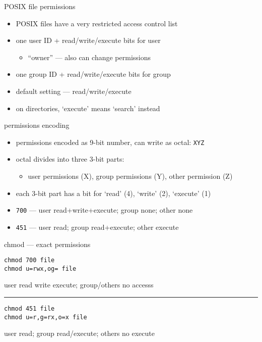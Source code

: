 \begin{frame}{POSIX file permissions}
    \begin{itemize}
    \item POSIX files have a very restricted access control list
    \vspace{.5cm}
    \item one user ID + read/write/execute bits for user
        \begin{itemize}
        \item ``owner'' --- also can change permissions
        \end{itemize}
    \item one group ID + read/write/execute bits for group
    \item default setting --- read/write/execute
    \vspace{.5cm}
    \item on directories, `execute' means `search' instead
    \end{itemize}
\end{frame}

\begin{frame}{permissions encoding}
\begin{itemize}
    \item permissions encoded as 9-bit number, can write as octal: \texttt{XYZ}
    \item octal divides into three 3-bit parts:
        \begin{itemize}
        \item user permissions (X), group permissions (Y), other permission (Z)
        \end{itemize}
    \item each 3-bit part has a bit for `read' (4), `write' (2), `execute' (1)
    \vspace{.5cm}
    \item \texttt{700} --- user read+write+execute; group none; other none
    \item \texttt{451} --- user read; group read+execute; other execute
\end{itemize}
\end{frame}

\begin{frame}[fragile]{chmod --- exact permissions}
\begin{Verbatim}
chmod 700 file
chmod u=rwx,og= file
\end{Verbatim}
user read write execute; group/others no accesss
    \vspace{.1cm}
\hrule
\begin{Verbatim}
chmod 451 file
chmod u=r,g=rx,o=x file
\end{Verbatim}
user read; group read/execute; others no execute
\end{frame}


